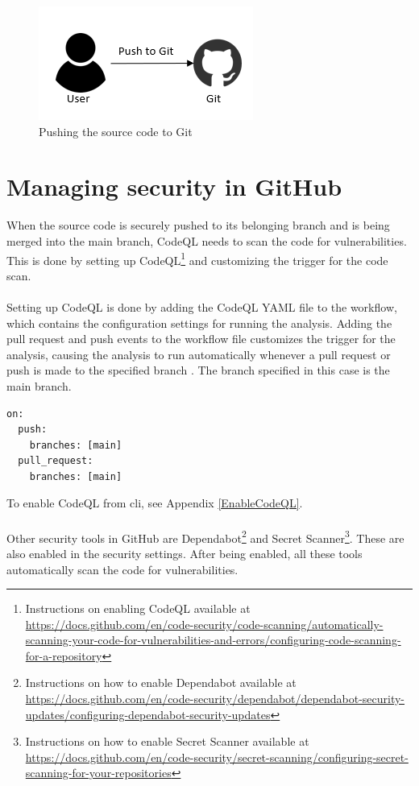 \vspace{2mm}
\begin{figure}[H]
    \centering
    \includegraphics[width=0.5\columnwidth]{Images/aws-piplin-1.png}
    \caption{Pushing the source code to Git}
    \label{fig: Pushing the source code to Git}
\end{figure}

\section{Managing security in GitHub}
When the source code is securely pushed to its belonging branch and is being merged into the main branch, CodeQL needs to scan the code for vulnerabilities. This is done by setting up CodeQL\footnote{Instructions on enabling CodeQL available at \url{https://docs.github.com/en/code-security/code-scanning/automatically-scanning-your-code-for-vulnerabilities-and-errors/configuring-code-scanning-for-a-repository}} and customizing the trigger for the code scan. 
\\~\\
Setting up CodeQL is done by adding the CodeQL YAML file to the workflow, which contains the configuration settings for running the analysis. Adding the pull request and push events to the workflow file customizes the trigger for the analysis, causing the analysis to run automatically whenever a pull request or push is made to the specified branch \cite{CodeQLCustom}. The branch specified in this case is the main branch. 

\vspace{2mm}
\begin{lstlisting}[language=terraform, caption=Custom trigger for CodeQL alerts, captionpos=b, frame=single]
on:
  push:
    branches: [main]
  pull_request:
    branches: [main]
\end{lstlisting}

To enable CodeQL from \acrshort{cli}, see Appendix \ref{EnableCodeQL}.
\\~\\
Other security tools in GitHub are Dependabot\footnote{Instructions on how to enable Dependabot available at \url{https://docs.github.com/en/code-security/dependabot/dependabot-security-updates/configuring-dependabot-security-updates}} and Secret Scanner\footnote{Instructions on how to enable Secret Scanner available at \url{https://docs.github.com/en/code-security/secret-scanning/configuring-secret-scanning-for-your-repositories}}. These are also enabled in the security settings. After being enabled, all these tools automatically scan the code for vulnerabilities.

